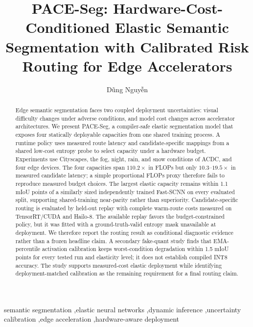 \documentclass[a4paper,review,12pt]{elsarticle}
\newcommand{\method}{PACE-Seg}
\newcommand{\miou}{mIoU}
\begin{document}
\begin{frontmatter}

\title{PACE-Seg: Hardware-Cost-Conditioned Elastic Semantic Segmentation with Calibrated Risk Routing for Edge Accelerators}

\author{D\~{u}ng Nguy\~{\^{e}}n}

\begin{abstract}
Edge semantic segmentation faces two coupled deployment uncertainties: visual difficulty changes under adverse conditions, and model cost changes across accelerator architectures. We present \method, a compiler-safe elastic segmentation model that exposes four statically deployable capacities from one shared training process. A runtime policy uses measured route latency and candidate-specific mappings from a shared low-cost entropy probe to select capacity under a hardware budget. Experiments use Cityscapes, the fog, night, rain, and snow conditions of ACDC, and four edge devices. The four capacities span $110.2\times$ in FLOPs but only $10.3$--$19.5\times$ in measured candidate latency; a simple proportional FLOPs proxy therefore fails to reproduce measured budget choices. The largest elastic capacity remains within 1.1 \miou{} points of a similarly sized independently trained Fast-SCNN on every evaluated split, supporting shared-training near-parity rather than superiority. Candidate-specific routing is evaluated by held-out replay with complete warm-route costs measured on TensorRT/CUDA and Hailo-8. The available replay favors the budget-constrained policy, but it was fitted with a ground-truth-valid entropy mask unavailable at deployment. We therefore report the routing result as conditional diagnostic evidence rather than a frozen headline claim. A secondary fake-quant study finds that EMA-percentile activation calibration keeps worst-condition degradation within 1.5 \miou{} points for every tested run and elasticity level; it does not establish compiled INT8 accuracy. The study supports measured-cost elastic deployment while identifying deployment-matched calibration as the remaining requirement for a final routing claim.
\end{abstract}

\begin{keyword}
semantic segmentation \sep elastic neural networks \sep dynamic inference \sep uncertainty calibration \sep edge acceleration \sep hardware-aware deployment
\end{keyword}

\end{frontmatter}
\end{document}

